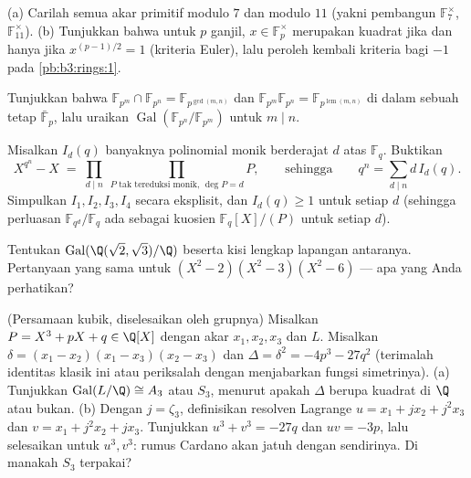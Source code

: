 \begin{exercise}[$\star\star$]\label{exo:b3:galois:4}
(a) Carilah semua akar primitif modulo $7$ dan modulo $11$ (yakni
pembangun $\mathbb F_7^\times$, $\mathbb F_{11}^\times$).
(b) Tunjukkan bahwa untuk $p$ ganjil, $x \in \mathbb F_p^\times$ merupakan
kuadrat jika dan hanya jika $x^{(p-1)/2} = 1$ (kriteria Euler), lalu peroleh kembali
kriteria bagi $-1$ pada \cref{pb:b3:rings:1}.
\end{exercise}

\begin{exercise}[$\star\star$]\label{exo:b3:galois:5}
Tunjukkan bahwa $\mathbb F_{p^m} \cap \mathbb F_{p^n} = \mathbb
F_{p^{\gcd(m,n)}}$ dan $\mathbb F_{p^m}\mathbb F_{p^n} = \mathbb
F_{p^{\operatorname{lcm}(m,n)}}$ di dalam sebuah 
tetap $\bar{\mathbb F}_p$, lalu uraikan
$\operatorname{Gal}(\mathbb F_{p^n}/\mathbb F_{p^m})$ untuk $m
\mid n$.
\end{exercise}

\begin{exercise}[$\star\star$]\label{exo:b3:galois:6}
Misalkan $I_d(q)$ banyaknya polinomial monik 
berderajat $d$ atas $\mathbb F_q$. Buktikan
\[
X^{q^n} - X \;=\; \prod_{d \mid n}\ \prod_{P \text{ tak tereduksi
monik, } \deg P = d} P ,
\qquad\text{sehingga}\qquad
q^n = \sum_{d \mid n} d\, I_d(q).
\]
Simpulkan $I_1, I_2, I_3, I_4$ secara eksplisit, dan $I_d(q) \geq 1$ untuk
setiap $d$ (sehingga perluasan $\mathbb F_{q^d}/\mathbb F_q$ ada sebagai
kuosien $\mathbb F_q[X]/(P)$ untuk setiap $d$).
\end{exercise}

\begin{exercise}[$\star\star$]\label{exo:b3:galois:7}
Tentukan $\operatorname{Gal}(\Q(\sqrt2,\sqrt3)/\Q)$ beserta
kisi lengkap lapangan antaranya. Pertanyaan yang sama untuk
 $(X^2-2)(X^2-3)(X^2-6)$ --- apa yang Anda
perhatikan?
\end{exercise}

\begin{exercise}[$\star\star$]\label{exo:b3:galois:8}
(Persamaan kubik, diselesaikan oleh grupnya) Misalkan $P = X^3 + pX + q \in
\Q[X]$  dengan akar $x_1, x_2, x_3$ dan  $L$. Misalkan $\delta = (x_1 - x_2)(x_1 - x_3)(x_2 - x_3)$ dan
$\Delta = \delta^2 = -4p^3 - 27q^2$ (terimalah identitas klasik ini
atau periksalah dengan menjabarkan fungsi simetrinya).
(a) Tunjukkan $\operatorname{Gal}(L/\Q) \cong A_3$ atau $S_3$, menurut
apakah $\Delta$ berupa kuadrat di $\Q$ atau bukan.
(b) Dengan $j = \zeta_3$, definisikan resolven Lagrange $u = x_1
+ jx_2 + j^2x_3$ dan $v = x_1 + j^2x_2 + jx_3$. Tunjukkan $u^3 + v^3
= -27q$ dan $uv = -3p$, lalu selesaikan untuk $u^3, v^3$: rumus Cardano
akan jatuh dengan sendirinya. Di manakah  $S_3$ terpakai?
\end{exercise}

